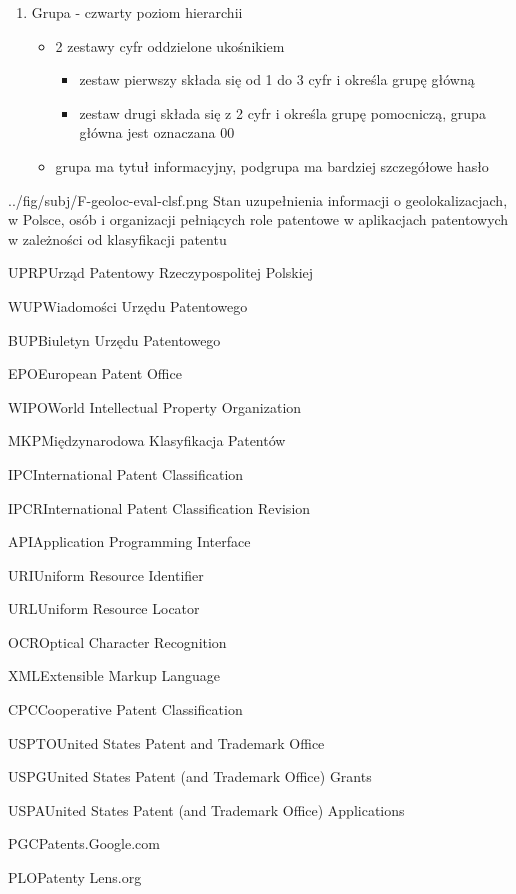 \begin{enumerate}
\item Grupa - czwarty poziom hierarchii

  \begin{itemize}
\item 2 zestawy cyfr oddzielone ukośnikiem

  \begin{itemize}
\item zestaw pierwszy składa się od 1 do 3 cyfr i określa grupę główną
\item zestaw drugi składa się z 2 cyfr i określa grupę pomocniczą, grupa główna jest oznaczana 00
\end{itemize}

\item grupa ma tytuł informacyjny, podgrupa ma bardziej szczegółowe hasło
\end{itemize}

\end{enumerate}




\figside
{../fig/subj/F-geoloc-eval-clsf.png}
{ Stan uzupełnienia informacji o geolokalizacjach, w Polsce, 
  osób i organizacji pełniących role patentowe
  w aplikacjach patentowych w zależności od klasyfikacji patentu}




  \newpage\begin{acronym}

\acro
{UPRP}{Urząd Patentowy Rzeczypospolitej Polskiej}

\acro
{WUP}{Wiadomości Urzędu Patentowego}

\acro
{BUP}{Biuletyn Urzędu Patentowego}

\acro
{EPO}{European Patent Office}

\acro
{WIPO}{World Intellectual Property Organization}

\acro
{MKP}{Międzynarodowa Klasyfikacja Patentów}

\acro
{IPC}{International Patent Classification}

\acro
{IPCR}{International Patent Classification Revision}

\acro
{API}{Application Programming Interface}

\acro
{URI}{Uniform Resource Identifier}

\acro
{URL}{Uniform Resource Locator}

\acro
{OCR}{Optical Character Recognition}

\acro
{XML}{Extensible Markup Language}

\acro
{CPC}{Cooperative Patent Classification}

\acro
{USPTO}{United States Patent and Trademark Office}

\acro
{USPG}{United States Patent (and Trademark Office) Grants}

\acro
{USPA}{United States Patent (and Trademark Office) Applications}

\acro
{PGC}{Patents.Google.com}

\acro
{PLO}{Patenty Lens.org}

\end{acronym}